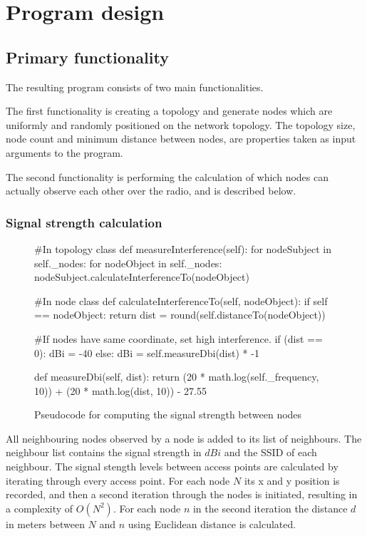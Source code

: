 	\section{Program design}\label{prog_design}
	\subsection{Primary functionality}
	The resulting program consists of two main functionalities.

	The first functionality is creating a topology and generate nodes which are uniformly
	and randomly positioned on the network topology. The topology size, node count and minimum distance
	between nodes, are properties taken as input arguments to the program.

	The second functionality is performing the calculation of which nodes can actually observe each other over the radio, and is described below.

	\subsubsection{Signal strength calculation}
	\begin{figure}
		\begin{python}
			#In topology class
			def measureInterference(self):
				for nodeSubject in self._nodes:  
					for nodeObject in self._nodes:
						nodeSubject.calculateInterferenceTo(nodeObject) 

			#In node class
			def calculateInterferenceTo(self, nodeObject):
				if self == nodeObject:
					return
				dist = round(self.distanceTo(nodeObject))

			#If  nodes have same coordinate, set high interference. 
				if (dist == 0):
					dBi = -40
				else:
					dBi  = self.measureDbi(dist) * -1

			def measureDbi(self, dist):
				return (20 * math.log(self._frequency, 10)) + 
				(20 * math.log(dist, 10)) - 27.55

		\end{python}
		\caption{Pseudocode for computing the signal strength between nodes}
		\label{fig:dbiCreation}
	\end{figure}

	All neighbouring nodes observed by a node is added to its list of neighbours. The neighbour list contains the signal strength in $dBi$ and the SSID of each neighbour.
	The signal stength levels between access points are calculated by iterating through every access point. For each node $N$ its x and y position is recorded,
	and then a second iteration through the nodes is initiated, resulting in a complexity of $O(N^2)$. For each node $n$ in the second iteration the distance $d$ in
	meters between $N$ and $n$ using Euclidean distance is calculated.
	
